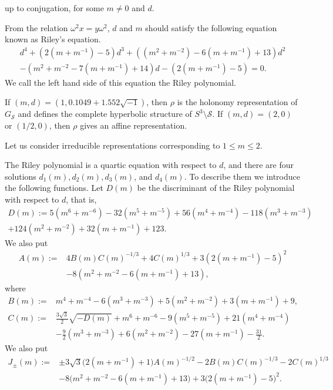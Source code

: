 \documentclass[a4paper,dvipdfmx]{amsart}
\theoremstyle{plain}
\theoremstyle{definition}
\theoremstyle{remark}
\newcommand{\St}{\mathscr{S}}
\renewcommand{\i}{\sqrt{-1}}
\numberwithin{equation}{section}
\begin{document}
up to conjugation, for some $m\ne0$ and $d$.
\par
From the relation $\omega^2x=y\omega^2$, $d$ and $m$ should satisfy the following equation known as Riley's equation.
\begin{multline*}
  d^4
  +\left(2(m+m^{-1})-5\right)d^3
  +\left((m^2+m^{-2})-6(m+m^{-1})+13\right)d^2
  \\
  -\left(m^2+m^{-2}-7(m+m^{-1})+14\right)d
  -\left(2(m+m^{-1})-5\right)
  =0.
\end{multline*}
We call the left hand side of this equation the Riley polynomial.
\par
If $(m,d)=(1,0.1049+1.552\i)$, then $\rho$ is the holonomy representation of $G_{\St}$ and defines the complete hyperbolic structure of $S^3\setminus\St$.
If $(m,d)=(2,0)$ or $(1/2,0)$, then $\rho$ gives an affine representation.
\par
Let us consider irreducible representations corresponding to $1\le m\le2$.
\par
The Riley polynomial is a quartic equation with respect to $d$, and there are four solutions $d_1(m), d_2(m), d_3(m)$, and $d_4(m)$.
To describe them we introduce the following functions.
Let $D(m)$ be the discriminant of the Riley polynomial with respect to $d$, that is,
\begin{multline*}
  D(m)
  :=
  5(m^{6}+m^{-6})
  -32(m^{5}+m^{-5})
  +56(m^{4}+m^{-4})
  -118(m^3+m^{-3})
  \\
  +124(m^2+m^{-2})
  +32(m+m^{-1})
  +123.
\end{multline*}
We also put
\begin{equation*}
\begin{split}
  A(m)
  :=&
  4B(m)C(m)^{-1/3}+4C(m)^{1/3}
  +3\left(2(m+m^{-1})-5\right)^2
  \\
  &
  -8\left(m^2+m^{-2}-6(m+m^{-1})+13\right),
\end{split}
\end{equation*}
where
\begin{align*}
  B(m)
  :=&
  m^4+m^{-4}-6(m^3+m^{-3})+5(m^2+m^{-2})+3(m+m^{-1})+9,
  \\
  C(m)
  :=&
  \frac{3\sqrt{3}}{2}\sqrt{-D(m)}+m^6+m^{-6}-9(m^5+m^{-5})+21(m^4+m^{-4})
  \\
  &-\frac{9}{2}(m^{3}+m^{-3})+6(m^2+m^{-2})-27(m+m^{-1})-\frac{31}{2}.
\end{align*}
We also put
\begin{align*}
  J_{\pm}(m)
  :=&
  \pm3\sqrt{3}\bigr(2(m+m^{-1})+1\bigr)A(m)^{-1/2}
  -2B(m)C(m)^{-1/3}-2C(m)^{1/3}
  \\
  &
  -8\bigl(m^2+m^{-2}-6(m+m^{-1})+13\bigr)
  +3\bigl(2(m+m^{-1})-5\bigr)^2.
\end{align*}
\end{document}
